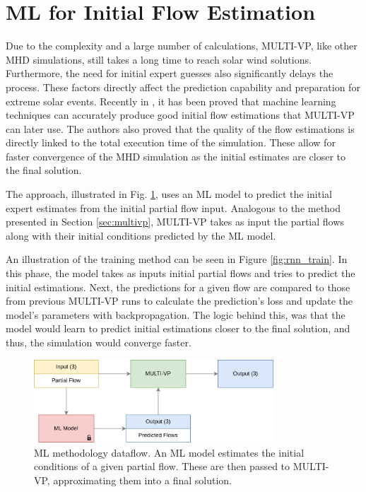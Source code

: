 \section{ML for Initial Flow Estimation}\label{sec:ml_initial_flow}
Due to the complexity and a large number of calculations, MULTI-VP, like other MHD simulations, still takes a long time to reach solar wind solutions. Furthermore, the need for initial expert guesses also significantly delays the process. These factors directly affect the prediction capability and preparation for extreme solar events. Recently in \cite{barros_InitialConditionEstimation_}, it has been proved that machine learning techniques can accurately produce good initial flow estimations that MULTI-VP can later use. The authors also proved that the quality of the flow estimations is directly linked to the total execution time of the simulation. These allow for faster convergence of the MHD simulation as the initial estimates are closer to the final solution. 

The approach, illustrated in Fig. \ref{fig:multivp_rnn}, uses an ML model to predict the initial expert estimates from the initial partial flow input. Analogous to the method presented in Section \ref{sec:multivp}, MULTI-VP takes as input the partial flows along with their initial conditions predicted by the ML model.

An illustration of the training method can be seen in Figure \ref*{fig:rnn_train}. In this phase, the model takes as inputs initial partial flows and tries to predict the initial estimations. Next, the predictions for a given flow are compared to those from previous MULTI-VP runs to calculate the prediction's loss and update the model's parameters with backpropagation. The logic behind this, was that the model would learn to predict initial estimations closer to the final solution, and thus, the simulation would converge faster.

\begin{figure}[ht]
\centering
\includegraphics[width=0.8\textwidth]{figures/multivp_rnn.png}
\caption[ML methodology dataflow]{ML methodology dataflow. An ML model estimates the initial conditions of a given partial flow. These are then passed to MULTI-VP, approximating them into a final solution. \label{fig:multivp_rnn}}
\end{figure}

